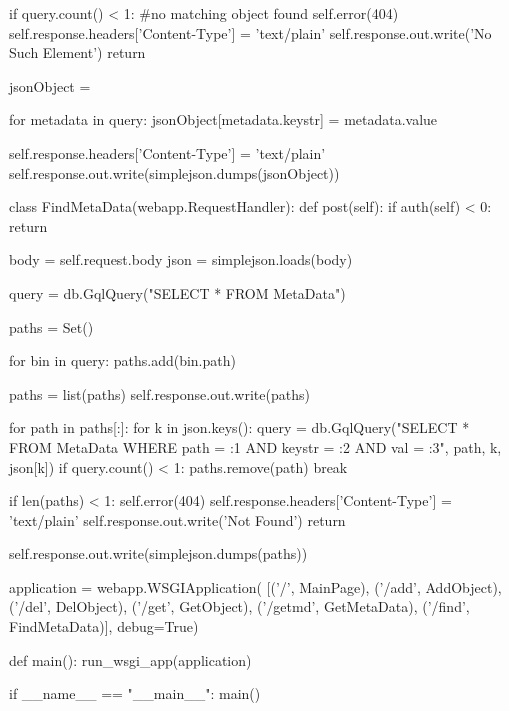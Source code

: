 \begin{code}
    if query.count() < 1: #no matching object found
      self.error(404)
      self.response.headers['Content-Type'] = 'text/plain'
      self.response.out.write('No Such Element')
      return
    
    jsonObject = {}
    
    for metadata in query:
      jsonObject[metadata.keystr] = metadata.value
      
    self.response.headers['Content-Type'] = 'text/plain'
    self.response.out.write(simplejson.dumps(jsonObject))   

class FindMetaData(webapp.RequestHandler):
  def post(self):
    if auth(self) < 0: return
    
    body = self.request.body
    json = simplejson.loads(body)
    
    query = db.GqlQuery("SELECT * FROM MetaData")
    
    paths = Set()
    
    for bin in query:
      paths.add(bin.path)
      
    paths  = list(paths)
    self.response.out.write(paths)
    
    for path in paths[:]:
      for k in json.keys():
        query = db.GqlQuery("SELECT * FROM MetaData WHERE path = :1 AND keystr = :2 AND val = :3", path, k, json[k])
        if query.count() < 1:
          paths.remove(path)
          break
    
    if len(paths) < 1:
      self.error(404)
      self.response.headers['Content-Type'] = 'text/plain'
      self.response.out.write('Not Found')
      return
    
    self.response.out.write(simplejson.dumps(paths))  

application = webapp.WSGIApplication(
                                     [('/',      MainPage),
                                      ('/add',   AddObject),
                                      ('/del',   DelObject),
                                      ('/get',   GetObject),
                                      ('/getmd', GetMetaData),
                                      ('/find',  FindMetaData)],
                                     debug=True)

def main():
  run_wsgi_app(application)

if __name__ == "__main__":
  main()
\end{code}